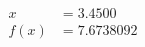 \documentclass[preview]{standalone}
\begin{document}
\begin{align*}
x &= 3.4500\\f(x) &= 7.6738092
\end{align*}
\end{document}
